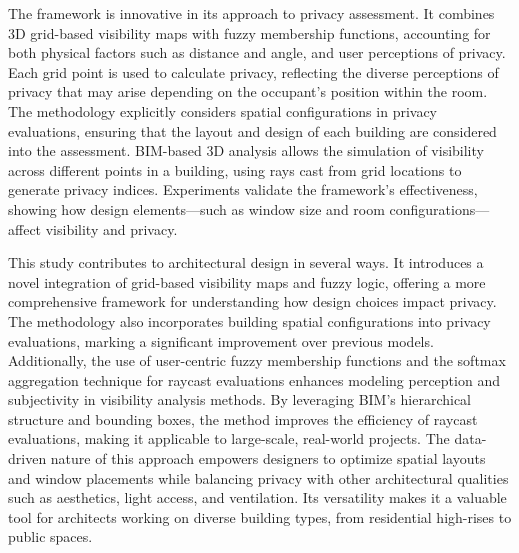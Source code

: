 \documentclass[final,3p,times,review]{elsarticle}
\begin{document}
The framework is innovative in its approach to privacy assessment. It combines 3D grid-based visibility maps with fuzzy membership functions, accounting for both physical factors such as distance and angle, and user perceptions of privacy.  Each grid point is used to calculate privacy, reflecting the diverse perceptions of privacy that may arise depending on the occupant’s position within the room. The methodology explicitly considers spatial configurations in privacy evaluations, ensuring that the layout and design of each building are considered into the assessment. BIM-based 3D analysis allows the simulation of visibility across different points in a building, using rays cast from grid locations to generate privacy indices. Experiments validate the framework's effectiveness, showing how design elements—such as window size and room configurations—affect visibility and privacy. 

This study contributes to architectural design in several ways. It introduces a novel integration of grid-based visibility maps and fuzzy logic, offering a more comprehensive framework for understanding how design choices impact privacy. The methodology also incorporates building spatial configurations into privacy evaluations, marking a significant improvement over previous models. Additionally, the use of user-centric fuzzy membership functions and the softmax aggregation technique for raycast evaluations enhances modeling perception and subjectivity in visibility analysis methods. By leveraging BIM’s hierarchical structure and bounding boxes, the method improves the efficiency of raycast evaluations, making it applicable to large-scale, real-world projects. The data-driven nature of this approach empowers designers to optimize spatial layouts and window placements while balancing privacy with other architectural qualities such as aesthetics, light access, and ventilation. Its versatility makes it a valuable tool for architects working on diverse building types, from residential high-rises to public spaces.
\end{document}
